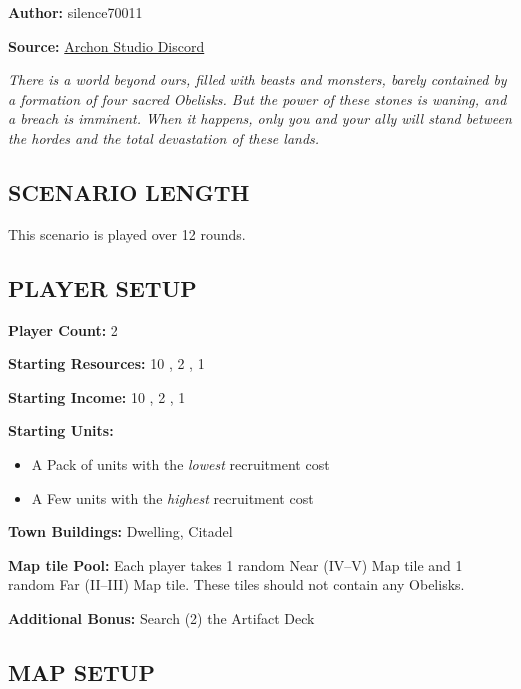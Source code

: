 
\begin{multicols}{2}

\textbf{Author:} silence70011

\textbf{Source:} \href{https://discord.com/channels/740870068178649108/1233112440322002964/1233112440322002964}{Archon Studio Discord}

\textit{There is a world beyond ours, filled with beasts and monsters, barely contained by a formation of four sacred Obelisks.
  But the power of these stones is waning, and a breach is imminent.
  When it happens, only you and your ally will stand between the hordes and the total devastation of these lands.
}

\subsection*{\MakeUppercase{Scenario Length}}

This scenario is played over 12 rounds.

\subsection*{\MakeUppercase{Player Setup}}

\textbf{Player Count:} 2

\textbf{Starting Resources:} 10 , 2 , 1 

\textbf{Starting Income:} 10 , 2 , 1 

\textbf{Starting Units:}
\begin{itemize}
  \item A Pack of  units with the \textit{lowest} recruitment cost
  \item A Few  units with the \textit{highest} recruitment cost
\end{itemize}

\textbf{Town Buildings:}  Dwelling, Citadel

\textbf{Map tile Pool:} Each player takes 1 random Near (IV--V) Map tile and 1 random Far (II--III) Map tile. These tiles should not contain any Obelisks.

\textbf{Additional Bonus:} Search (2) the Artifact Deck

\subsection*{\MakeUppercase{Map Setup}}


\end{multicols}
